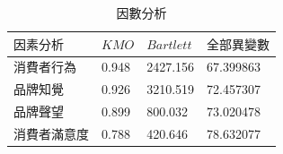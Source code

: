 \begin{table}[htb]
\caption{因數分析}
\label{tab:p4}
\renewcommand{\arraystretch}{1.2} %
\arrayrulewidth=1pt               %
\tabcolsep=6pt                   %
\begin{tabular}[t]{llll}  %
\hline
 $因素分析$& $KMO$ & $Bartlett$& $全部異變數$ \\
\hline
消費者行為&0.948&2427.156&67.399863\\
 品牌知覺&0.926&3210.519&72.457307  \\
 品牌聲望&0.899&800.032&73.020478  \\
消費者滿意度&0.788&420.646&78.632077  \\
\hline
\end{tabular}
\end{table}


